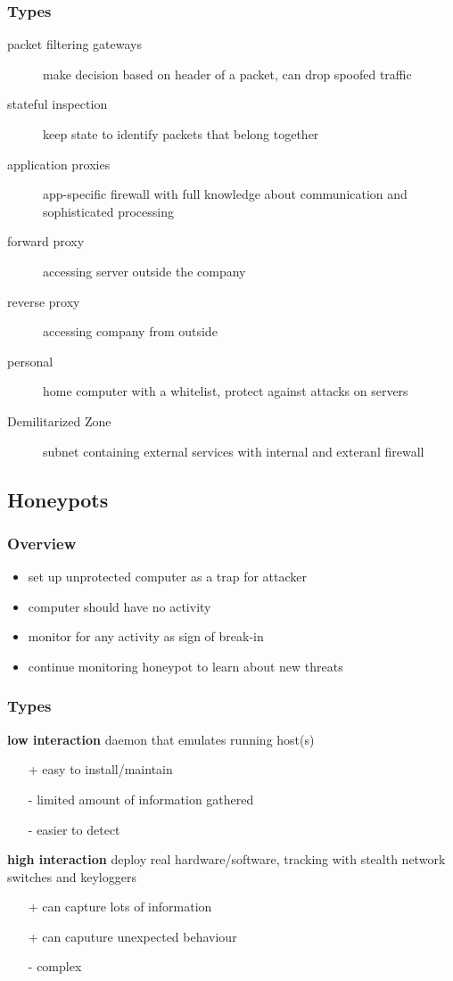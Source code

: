 \documentclass[]{article}
\theoremstyle{definition}
\begin{document}
	\subsubsection{Types}
	\begin{description}
		\item[packet filtering gateways] make decision based on header of a packet, can drop spoofed traffic
		\item[stateful inspection] keep state to identify packets that belong together
		\item[application proxies] app-specific firewall with full knowledge about communication and sophisticated processing
		\item[forward proxy] accessing server outside the company
		\item[reverse proxy] accessing company from outside
		\item[personal] home computer with a whitelist, protect against attacks on servers
		\item[Demilitarized Zone] subnet containing external services with internal and exteranl firewall
	\end{description}

	\subsection{Honeypots}
	\subsubsection{Overview}
	\begin{itemize}
		\item set up unprotected computer as a trap for attacker
		\item computer should have no activity
		\item monitor for any activity as sign of break-in
		\item continue monitoring honeypot to learn about new threats
	\end{itemize}

	\subsubsection{Types}
	\textbf{low interaction} daemon that emulates running host(s)
	\begin{itemize}
		\item[+] easy to install/maintain
		\item[-] limited amount of information gathered
		\item[-] easier to detect
	\end{itemize}
	\textbf{high interaction} deploy real hardware/software, tracking with stealth network switches and keyloggers
	\begin{itemize}
		\item[+] can capture lots of information
		\item[+] can caputure unexpected behaviour
		\item[-] complex
	\end{itemize}
\end{document}
